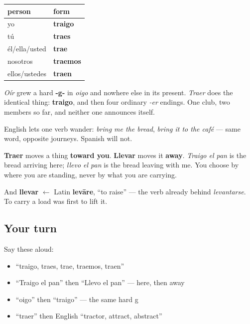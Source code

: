 \begin{grammarlens}[title={Grammar Lens: the hard g, for the second time}]
\noindent
\begin{tabularx}{\linewidth}{@{}>{\raggedright\arraybackslash}X>{\raggedright\arraybackslash}X@{}}
\toprule
\textbf{person} & \textbf{form} \\
\midrule
yo & \textbf{traigo} \\
tú & \textbf{traes} \\
él/ella/usted & \textbf{trae} \\
nosotros & \textbf{traemos} \\
ellos/ustedes & \textbf{traen} \\
\bottomrule
\end{tabularx}

\emph{Oír} grew a hard \textbf{-g-} in \emph{oigo} and nowhere else in its present. \emph{Traer} does the identical thing: \textbf{traigo}, and then four ordinary \emph{-er} endings. One club, two members so far, and neither one announces itself.
\end{grammarlens}

\begin{culture}
English lets one verb wander: \emph{bring me the bread}, \emph{bring it to the café} — same word, opposite journeys. Spanish will not.

\textbf{Traer} moves a thing \textbf{toward you}. \textbf{Llevar} moves it \textbf{away}. \emph{Traigo el pan} is the bread arriving here; \emph{llevo el pan} is the bread leaving with me. You choose by where you are standing, never by what you are carrying.

And \textbf{llevar} $\leftarrow$ Latin \textbf{levāre}, \textquotedblleft{}to raise\textquotedblright{} — the verb already behind \emph{levantarse}. To carry a load was first to lift it.
\end{culture}

\subsection*{Your turn}
Say these aloud:

\begin{itemize}
\raggedright
  \item \textquotedblleft{}traigo, traes, trae, traemos, traen\textquotedblright{}
  \item \textquotedblleft{}Traigo el pan\textquotedblright{} then \textquotedblleft{}Llevo el pan\textquotedblright{} — here, then away
  \item \textquotedblleft{}oigo\textquotedblright{} then \textquotedblleft{}traigo\textquotedblright{} — the same hard g
  \item \textquotedblleft{}traer\textquotedblright{} then English \textquotedblleft{}tractor, attract, abstract\textquotedblright{}
\end{itemize}

